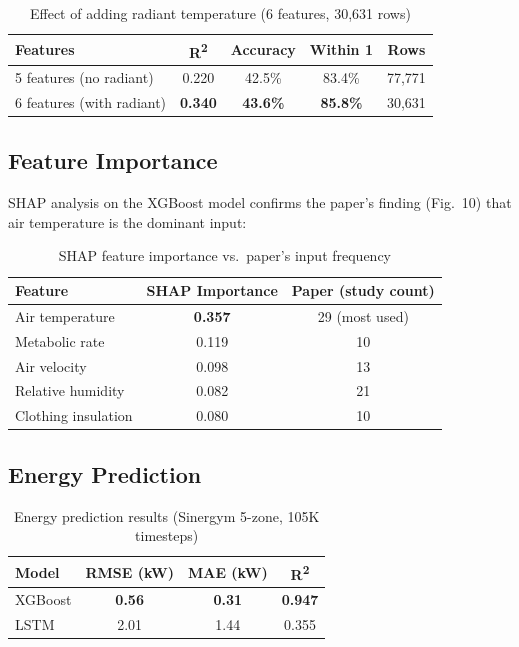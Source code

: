 \documentclass[11pt,a4paper]{article}
\begin{document}
\begin{table}[H]
\centering
\caption{Effect of adding radiant temperature (6 features, 30,631 rows)}
\label{tab:comfort6}
\begin{tabular}{lcccc}
\toprule
Features & R\textsuperscript{2} & Accuracy & Within 1 & Rows \\
\midrule
5 features (no radiant) & 0.220 & 42.5\% & 83.4\% & 77,771 \\
6 features (with radiant) & \textbf{0.340} & \textbf{43.6\%} & \textbf{85.8\%} & 30,631 \\
\bottomrule
\end{tabular}
\end{table}

\subsection{Feature Importance}

SHAP analysis on the XGBoost model confirms the paper's finding (Fig.\ 10) that air temperature is the dominant input:

\begin{table}[H]
\centering
\caption{SHAP feature importance vs.\ paper's input frequency}
\label{tab:shap}
\begin{tabular}{lcc}
\toprule
Feature & SHAP Importance & Paper (study count) \\
\midrule
Air temperature & \textbf{0.357} & 29 (most used) \\
Metabolic rate & 0.119 & 10 \\
Air velocity & 0.098 & 13 \\
Relative humidity & 0.082 & 21 \\
Clothing insulation & 0.080 & 10 \\
\bottomrule
\end{tabular}
\end{table}

\subsection{Energy Prediction}

\begin{table}[H]
\centering
\caption{Energy prediction results (Sinergym 5-zone, 105K timesteps)}
\label{tab:energy}
\begin{tabular}{lccc}
\toprule
Model & RMSE (kW) & MAE (kW) & R\textsuperscript{2} \\
\midrule
XGBoost & \textbf{0.56} & \textbf{0.31} & \textbf{0.947} \\
LSTM & 2.01 & 1.44 & 0.355 \\
\bottomrule
\end{tabular}
\end{table}
\end{document}
